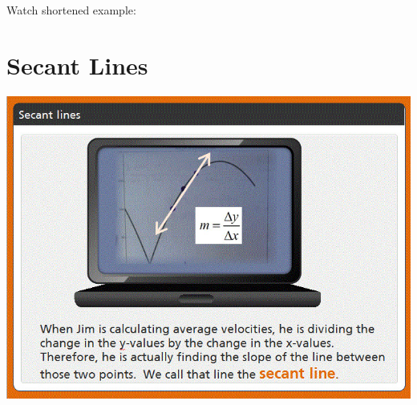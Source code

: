 \documentclass{ximera}
\begin{document}
Watch shortened example: 
\begin{foldable}
\end{foldable}


\section{Secant Lines}

\begin{image}
\includegraphics{picture4.jpg}
\end{image}

\end{document}
